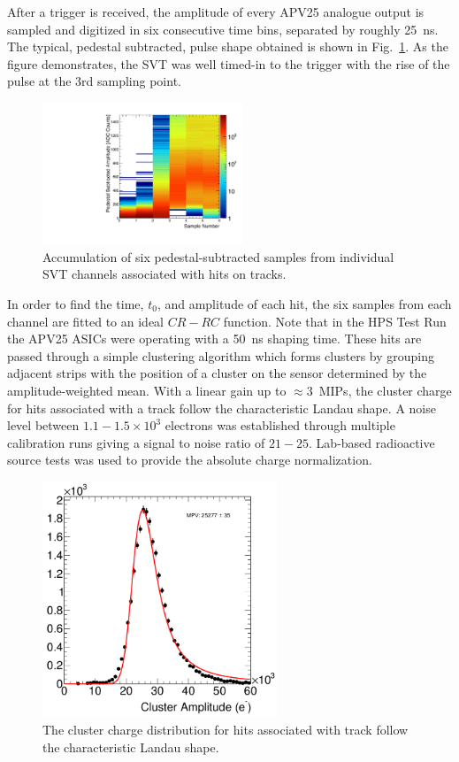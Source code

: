 \documentclass[final,3p,times,twocolumn]{elsarticle}
\begin{document}
After a trigger is received, the amplitude  of every  APV25 analogue output is sampled and digitized in 
six consecutive time bins, separated by roughly 25~ns.  
The typical, pedestal subtracted, pulse shape obtained is shown in Fig.~\ref{fig:pulse_shape}. 
As the figure demonstrates,  the SVT was well timed-in to the trigger with the rise of the pulse at the 3rd 
sampling point.  
\begin{figure}[]
\begin{center}
{\small
	\includegraphics[width=6cm]{figures/run1351_110513_samples_L1_top.pdf}
	\caption{Accumulation of six pedestal-subtracted samples from individual SVT channels associated 
	with hits on tracks.}
	\label{fig:pulse_shape}
}
\end{center}
\end{figure}
In order to find the time, $t_0$, and amplitude of each hit, the six samples from each channel are fitted 
to an ideal $CR-RC$ function. Note that in the HPS Test Run the APV25 ASICs were operating with a 50~ns 
shaping time. These hits are passed through a simple clustering algorithm which forms clusters by 
grouping adjacent strips with the position of a cluster on the sensor determined by the 
amplitude-weighted mean.
With a linear gain up to $\approx 3$~MIPs, the cluster charge for hits associated with a track follow 
the characteristic Landau shape. 
A noise level between $1.1-1.5\times 10^{3}$ electrons was established through multiple calibration 
runs giving a signal to noise ratio of $21-25$. Lab-based radioactive source tests was used to 
provide the absolute charge normalization.
\begin{figure}[]
\begin{center}
{\small
	\includegraphics[width=7cm]{figures/mip_top_layer_2.png}
    	\caption{ The cluster charge distribution for hits associated with track follow the characteristic 		Landau shape. }
	\label{fig:cluster_pulse}
}
\end{center}
\end{figure}
\end{document}
